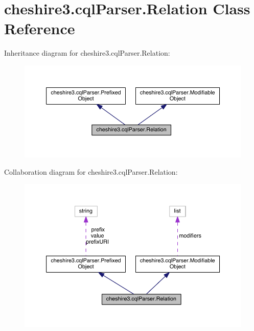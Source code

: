 \hypertarget{classcheshire3_1_1cql_parser_1_1_relation}{\section{cheshire3.\-cql\-Parser.\-Relation Class Reference}
\label{classcheshire3_1_1cql_parser_1_1_relation}
}


Inheritance diagram for cheshire3.\-cql\-Parser.\-Relation\-:
\nopagebreak
\begin{figure}[H]
\begin{center}
\leavevmode
\includegraphics[width=350pt]{classcheshire3_1_1cql_parser_1_1_relation__inherit__graph}
\end{center}
\end{figure}


Collaboration diagram for cheshire3.\-cql\-Parser.\-Relation\-:
\nopagebreak
\begin{figure}[H]
\begin{center}
\leavevmode
\includegraphics[width=350pt]{classcheshire3_1_1cql_parser_1_1_relation__coll__graph}
\end{center}
\end{figure}
